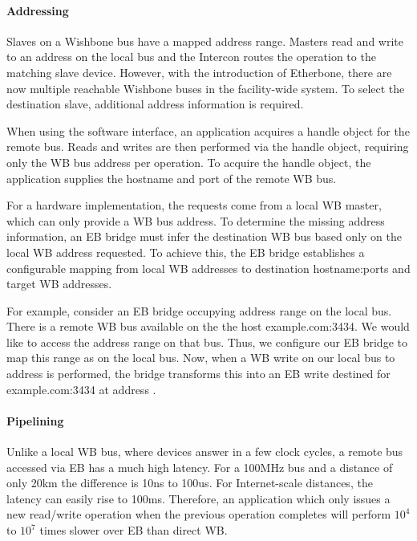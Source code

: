 \paragraph{Addressing}

Slaves on a Wishbone bus have a mapped address range. Masters read and write to an address on the local bus and the Intercon routes the operation to the matching slave device. 
However, with the introduction of Etherbone, there are now multiple reachable Wishbone buses in the facility-wide system. 
To select the destination slave, additional address information is required.

\vspace{5 mm}

\noindent When using the software interface, an application acquires a handle object for the remote bus. Reads and writes are then performed via the handle object, requiring only the WB bus address per operation. 
To acquire the handle object, the application supplies the hostname and port of the remote WB bus.

\vspace{5 mm}

\noindent For a hardware implementation, the requests come from a local WB master, which can only provide a WB bus address. 
To determine the missing address information, an EB bridge must infer the destination WB bus based only on the local WB address requested. 
To achieve this, the EB bridge establishes a configurable mapping from local WB addresses to destination hostname:ports and target WB addresses.

\vspace{5 mm}

\noindent For example, consider an EB bridge occupying address range  on the local bus. 
There is a remote WB bus available on the the host example.com:3434. 
We would like to access the address range  on that bus. Thus, we configure our EB bridge to map this range as  on the local bus. 
Now, when a WB write on our local bus to address  is performed, the bridge transforms this into an EB write destined for example.com:3434 at address .

\paragraph{Pipelining}
Unlike a local WB bus, where devices answer in a few clock cycles, a remote bus accessed via EB has a much high latency. 
For a 100MHz bus and a distance of only 20km the difference is 10ns to 100us. 
For Internet-scale distances, the latency can easily rise to 100ms.
Therefore, an application which only issues a new read/write operation when the previous operation completes will perform $10^4$ to $10^7$ times
slower over EB than direct WB.

